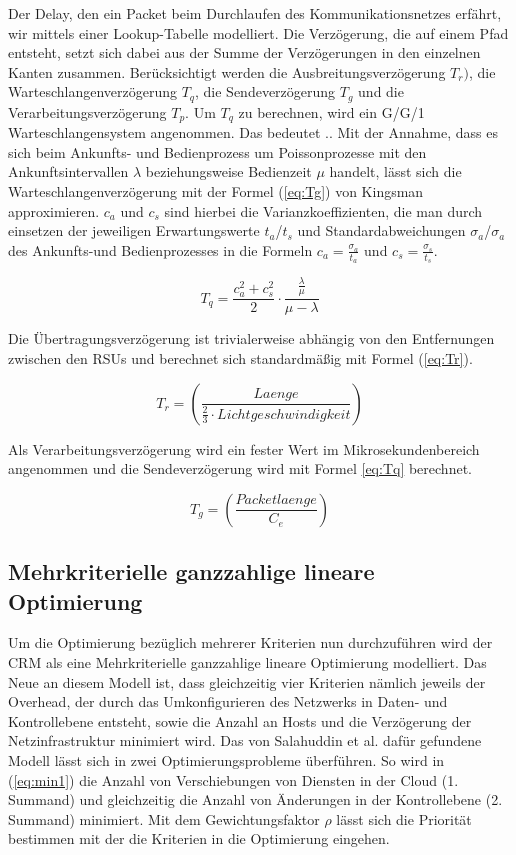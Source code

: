 \documentclass[conference]{IEEEtran}
\begin{document}
Der Delay, den ein Packet beim Durchlaufen des Kommunikationsnetzes erfährt, wir mittels einer Lookup-Tabelle modelliert. Die Verzögerung, die auf einem Pfad entsteht, setzt sich dabei aus der Summe der Verzögerungen in den einzelnen Kanten zusammen. Berücksichtigt werden die Ausbreitungsverzögerung \(T_r)\), die Warteschlangenverzögerung \(T_q\), die Sendeverzögerung \(T_g\) und die Verarbeitungsverzögerung \(T_p\). Um \(T_q\) zu berechnen, wird ein G/G/1 Warteschlangensystem angenommen. Das bedeutet .. Mit der Annahme, dass es sich beim Ankunfts- und Bedienprozess um Poissonprozesse mit den Ankunftsintervallen \(\lambda\) beziehungsweise Bedienzeit \(\mu\) handelt, lässt sich die Warteschlangenverzögerung mit der Formel (\ref{eq:Tg}) von Kingsman \cite{IEEEhowto:king} approximieren. \(c_a\) und \(c_s\) sind hierbei die Varianzkoeffizienten, die man durch einsetzen der jeweiligen Erwartungswerte \(t_a\)/\(t_s\) und Standardabweichungen \(\sigma_a\)/\(\sigma_a\) des Ankunfts-und Bedienprozesses in die Formeln \(c_a=\frac{\sigma_a}{t_a}\) und \(c_s=\frac{\sigma_s}{t_s}\).

\begin{equation}
T_q=\frac{c_a^2+c_s^2}{2}\cdot \frac{\frac{\lambda}{\mu}}{\mu-\lambda}
\label{eq:Tq}
\end{equation}

Die Übertragungsverzögerung ist trivialerweise abhängig von den Entfernungen zwischen den RSUs und berechnet sich standardmäßig mit Formel (\ref{eq:Tr}).

\begin{equation}
T_r=\left(\frac{Laenge}{\frac{2}{3}\cdot Lichtgeschwindigkeit}\right)
\label{eq:Tr}
\end{equation}

Als Verarbeitungsverzögerung wird ein fester Wert im Mikrosekundenbereich angenommen und die Sendeverzögerung wird mit Formel \ref{eq:Tq} berechnet.

\begin{equation}
T_g=\left(\frac{Packetlaenge}{C_e}\right)
\label{eq:Tg}
\end{equation}


\subsection{Mehrkriterielle ganzzahlige lineare Optimierung}

Um die Optimierung bezüglich mehrerer Kriterien nun durchzuführen wird der CRM als eine Mehrkriterielle ganzzahlige lineare Optimierung modelliert. Das Neue an diesem Modell ist, dass gleichzeitig vier Kriterien nämlich jeweils der Overhead, der durch das Umkonfigurieren des Netzwerks in Daten- und Kontrollebene entsteht, sowie die Anzahl an Hosts und die Verzögerung der Netzinfrastruktur minimiert wird. Das von Salahuddin et al. dafür gefundene Modell lässt sich in zwei Optimierungsprobleme überführen.
So wird in (\ref{eq:min1}) die Anzahl von Verschiebungen von Diensten in der Cloud (1. Summand) und gleichzeitig die Anzahl von Änderungen in der Kontrollebene (2. Summand) minimiert. Mit dem Gewichtungsfaktor \(\rho\) lässt sich die Priorität bestimmen mit der die Kriterien in die Optimierung eingehen. 
\end{document}
